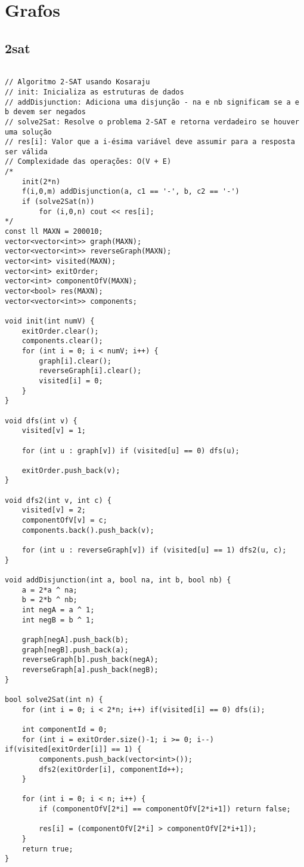 \documentclass[landscape,twocolumn,10pt,a4paper]{article}
\begin{document}
\section{Grafos}
\subsection{2sat}
\begin{verbatim}

// Algoritmo 2-SAT usando Kosaraju
// init: Inicializa as estruturas de dados
// addDisjunction: Adiciona uma disjunção - na e nb significam se a e b devem ser negados
// solve2Sat: Resolve o problema 2-SAT e retorna verdadeiro se houver uma solução
// res[i]: Valor que a i-ésima variável deve assumir para a resposta ser válida
// Complexidade das operações: O(V + E)
/*
    init(2*n)
    f(i,0,m) addDisjunction(a, c1 == '-', b, c2 == '-')
    if (solve2Sat(n))
        for (i,0,n) cout << res[i];
*/
const ll MAXN = 200010;
vector<vector<int>> graph(MAXN);
vector<vector<int>> reverseGraph(MAXN);
vector<int> visited(MAXN);
vector<int> exitOrder;
vector<int> componentOfV(MAXN);
vector<bool> res(MAXN);
vector<vector<int>> components;

void init(int numV) {
    exitOrder.clear();
    components.clear();
    for (int i = 0; i < numV; i++) {
        graph[i].clear();
        reverseGraph[i].clear();
        visited[i] = 0;
    }
}

void dfs(int v) {
    visited[v] = 1;

    for (int u : graph[v]) if (visited[u] == 0) dfs(u);

    exitOrder.push_back(v);
}

void dfs2(int v, int c) {
    visited[v] = 2;
    componentOfV[v] = c;
    components.back().push_back(v);

    for (int u : reverseGraph[v]) if (visited[u] == 1) dfs2(u, c);
}

void addDisjunction(int a, bool na, int b, bool nb) {
    a = 2*a ^ na;
    b = 2*b ^ nb;
    int negA = a ^ 1;
    int negB = b ^ 1;

    graph[negA].push_back(b);
    graph[negB].push_back(a);
    reverseGraph[b].push_back(negA);
    reverseGraph[a].push_back(negB);
}

bool solve2Sat(int n) {
    for (int i = 0; i < 2*n; i++) if(visited[i] == 0) dfs(i);

    int componentId = 0;
    for (int i = exitOrder.size()-1; i >= 0; i--) if(visited[exitOrder[i]] == 1) {
        components.push_back(vector<int>());
        dfs2(exitOrder[i], componentId++);
    }

    for (int i = 0; i < n; i++) {
        if (componentOfV[2*i] == componentOfV[2*i+1]) return false;

        res[i] = (componentOfV[2*i] > componentOfV[2*i+1]);
    }
    return true;
}


\end{verbatim}
\end{document}
